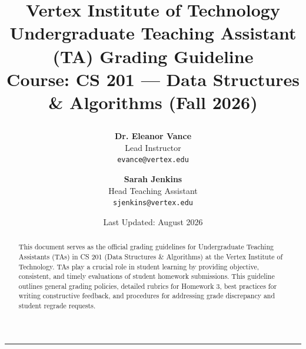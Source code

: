 \documentclass[11pt,letterpaper]{article}
\title{
    \vspace{-1.5cm}
    \begin{tcolorbox}[
        enhanced,
        colback=primary!5,
        colframe=primary,
        arc=4pt,
        boxrule=1.5pt,
        left=15pt, right=15pt, top=15pt, bottom=15pt
    ]
        \centering
        {\color{primary}\Huge\bfseries Vertex Institute of Technology}\\[0.4em]
        {\color{darkneutral}\Large\bfseries Undergraduate Teaching Assistant (TA) Grading Guideline}\\[0.3em]
        {\color{secondary}\large\bfseries Course: CS 201 --- Data Structures \& Algorithms (Fall 2026)}
    \end{tcolorbox}
    \vspace{-0.5em}
}
\author{
    \textbf{Dr. Eleanor Vance} \\
    Lead Instructor \\
    \texttt{evance@vertex.edu}
    \and
    \textbf{Sarah Jenkins} \\
    Head Teaching Assistant \\
    \texttt{sjenkins@vertex.edu}
}
\date{\vspace{-0.5em}\small Last Updated: August 2026}
\begin{document}
\maketitle

\begin{abstract}
    This document serves as the official grading guidelines for Undergraduate Teaching Assistants (TAs) in CS 201 (Data Structures \& Algorithms) at the Vertex Institute of Technology. TAs play a crucial role in student learning by providing objective, consistent, and timely evaluations of student homework submissions. This guideline outlines general grading policies, detailed rubrics for Homework 3, best practices for writing constructive feedback, and procedures for addressing grade discrepancy and student regrade requests.
\end{abstract}

\vspace{1.5em}
\hrule
\vspace{1.5em}


\newpage

\newpage

\newpage

\newpage


\newpage


\end{document}
